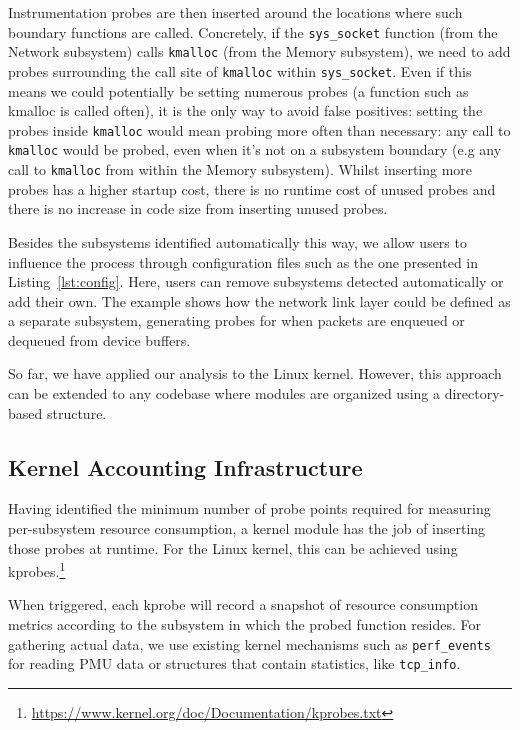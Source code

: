 \documentclass[letterpaper,twocolumn,10pt]{article}
\begin{document}
Instrumentation probes are then inserted around the locations where such
boundary functions are called. Concretely, if the \texttt{sys\_socket} function
(from the Network subsystem) calls \texttt{kmalloc} (from the Memory subsystem),
we need to add probes surrounding the call site of \texttt{kmalloc} within
\texttt{sys\_socket}. Even if this means we could potentially be setting
numerous probes (a function such as kmalloc is called often), it is the only way
to avoid false positives: setting the probes inside \texttt{kmalloc} would mean
probing more often than necessary: any call to \texttt{kmalloc} would be probed,
even when it's not on a subsystem boundary (e.g any call to \texttt{kmalloc} from
within the Memory subsystem). Whilst inserting more probes has a higher startup
cost, there is no runtime cost of unused probes and there is no increase in code
size from inserting unused probes.

Besides the subsystems identified automatically this way, we allow users to
influence the process through configuration files such as the one presented in
Listing~\ref{lst:config}. Here, users can remove subsystems detected
automatically or add their own. The example shows how the network link layer
could be defined as a separate subsystem, generating probes for when packets are
enqueued or dequeued from device buffers.

So far, we have applied our analysis to the Linux kernel. However, this
approach can be extended to any codebase where modules are organized using a
directory-based structure.


\subsection{Kernel Accounting Infrastructure}

Having identified the minimum number of probe points required for measuring per-subsystem
resource consumption, a kernel module has the job of inserting those probes at runtime.
For the Linux kernel, this can be achieved using kprobes.\footnote{\url{https://www.kernel.org/doc/Documentation/kprobes.txt}}

When triggered, each kprobe will record a snapshot of resource consumption metrics according
to the subsystem in which the probed function resides. For gathering actual data, we
use existing kernel mechanisms such as \texttt{perf\_events} for reading PMU
data or structures that contain statistics, like \texttt{tcp\_info}.
\end{document}
